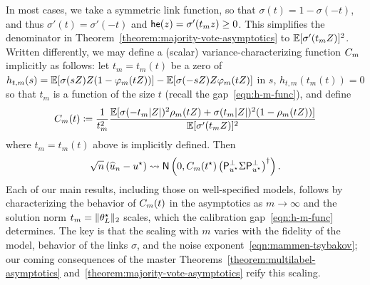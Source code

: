 In most cases, we take a symmetric link function,
so that $\sigma(t) = 1 - \sigma(-t)$, and thus $\sigma'(t) = \sigma'(-t)$
and $\mathsf{he}(z) = \sigma'(t_m z) \ge 0$. This simplifies the denominator
in Theorem~\ref{theorem:majority-vote-asymptotics} to
$\mathbb{E}[\sigma'(t_m Z)]^2$.
Written differently, we may define a (scalar) variance-characterizing
function $C_m$ implicitly as follows: let $t_m = t_m(t)$ be a
zero of $h_{t,m}(s) =
\mathbb{E}[\sigma(sZ) Z (1 - \varphi_m(t Z))] - \mathbb{E}[\sigma(-s Z) Z \varphi_m(t Z)]$
in $s$, $h_{t,m}(t_m(t)) = 0$ so that $t_m$
is a function of the size $t$ (recall the gap~\eqref{eqn:h-m-func}),
and define
\begin{equation}
  \label{eqn:generic-majority-covariance}
  C_m(t) \coloneqq \frac{1}{t_m^2} \frac{\mathbb{E}[\sigma(-t_m |Z|)^2
      \rho_m(t Z) + \sigma(t_m |Z|)^2 (1 - \rho_m(t Z))]}{
    \mathbb{E}[\sigma'(t_m Z)]^2}
\end{equation}
where $t_m = t_m(t)$ above is implicitly defined.  Then
\begin{equation*}
  \sqrt{n}\left(\widehat{u}_n - u^\star\right)
  \rightsquigarrow \mathsf{N}\left(0,
  C_m(t^\star) \left({\mathsf{P}_{u^\star}^\perp \Sigma \mathsf{P}_{u^\star}^\perp}\right)^\dagger
  \right).
\end{equation*}
Each of our main results, including those on well-specified models,
follows by characterizing the behavior of $C_m(t)$ in
the asymptotics as $m \to \infty$ and
the solution norm $t_m = \|{\theta_L^\star}\|_2$ scales,
which the calibration gap~\eqref{eqn:h-m-func} determines.
The key is that the scaling with $m$ varies with
the fidelity of the model, behavior of the links $\sigma$, and
the noise exponent~\eqref{eqn:mammen-tsybakov}; our coming
consequences of the master Theorems~\ref{theorem:multilabel-asymptotics}
and~\ref{theorem:majority-vote-asymptotics} reify this scaling.


%

